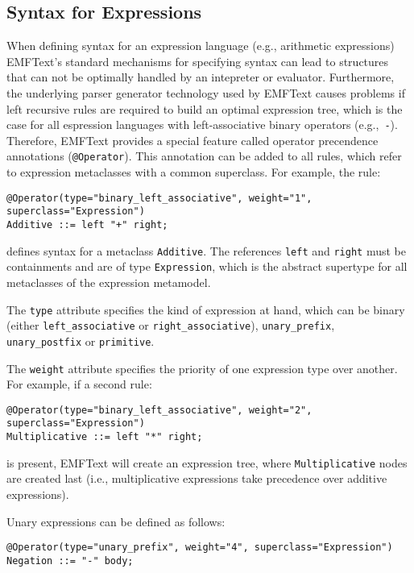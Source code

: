 \subsection{Syntax for Expressions}
When defining syntax for an expression language (e.g., arithmetic expressions) 
EMFText's standard mechanisms for specifying syntax can lead to structures that 
can not be optimally handled by an intepreter or evaluator. Furthermore, the 
underlying parser generator technology used by EMFText causes problems if 
left recursive rules are required to build an optimal expression tree, which is 
the case for all espression languages with left-associative binary operators 
(e.g.,~\texttt{-}). Therefore, EMFText provides a special feature called
operator precendence annotations (\texttt{@Operator}). This annotation can be added to 
all rules, which refer to expression metaclasses with a common superclass. 
For example, the rule:

\begin{lstlisting}
@Operator(type="binary_left_associative", weight="1", superclass="Expression")
Additive ::= left "+" right;
\end{lstlisting}

defines syntax for a metaclass \texttt{Additive}. The references
\texttt{left} and \texttt{right} must be containments and are of type
\texttt{Expression}, which is the abstract supertype for all metaclasses of the 
expression metamodel.

The \texttt{type} attribute specifies the kind of expression at hand, which can
be binary (either \texttt{left\_associative} or \texttt{right\_associative}),
\texttt{unary\_prefix}, \texttt{unary\_postfix} or \texttt{primitive}.

The \texttt{weight} attribute specifies the priority of one expression type over
another. For example, if a second rule:

\begin{lstlisting}
@Operator(type="binary_left_associative", weight="2", superclass="Expression")
Multiplicative ::= left "*" right;
\end{lstlisting}

is present, EMFText will create an expression tree, where
\texttt{Multiplicative} nodes are created last (i.e., multiplicative expressions 
take precedence over additive expressions).

Unary expressions can be defined as follows:

\begin{lstlisting}
@Operator(type="unary_prefix", weight="4", superclass="Expression")	
Negation ::= "-" body;
\end{lstlisting}

